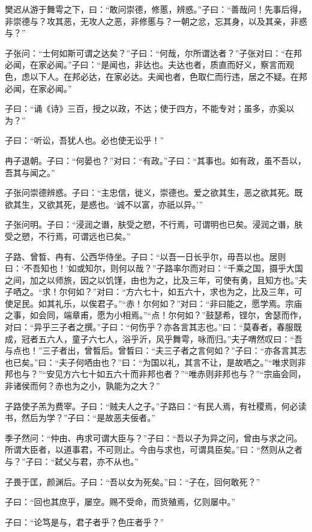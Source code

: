 \documentclass[a5paper]{ctexbook}
\begin{document}
    樊迟从游于舞雩之下，曰：“敢问崇德，修慝，辨惑。”子曰：“善哉问！先事后得，非崇德与？攻其恶，无攻人之恶，非修慝与？一朝之忿，忘其身，以及其亲，非惑与？”

    子张问：“士何如斯可谓之达矣？”子曰：“何哉，尔所谓达者？”子张对曰：“在邦必闻，在家必闻。”子曰：“是闻也，非达也。夫达也者，质直而好义，察言而观色，虑以下人。在邦必达，在家必达。夫闻也者，色取仁而行违，居之不疑。在邦必闻，在家必闻。”

    子曰：“诵《诗》三百，授之以政，不达；使于四方，不能专对；虽多，亦奚以为？”

    子曰：“听讼，吾犹人也。必也使无讼乎！”

    冉子退朝。子曰：“何晏也？”对曰：“有政。”子曰：“其事也。如有政，虽不吾以，吾其与闻之。”

    子张问崇德辨惑。子曰：“主忠信，徙义，崇德也。爱之欲其生，恶之欲其死。既欲其生，又欲其死，是惑也。‘诚不以富，亦祇以异。’”

    子张问明。子曰：“浸润之谮，肤受之愬，不行焉，可谓明也已矣。浸润之谮，肤受之愬，不行焉，可谓远也已矣。”

    子路、曾晳、冉有、公西华侍坐。子曰：“以吾一日长乎尔，毋吾以也。居则曰：‘不吾知也！’如或知尔，则何以哉？”子路率尔而对曰：“千乘之国，摄乎大国之间，加之以师旅，因之以饥馑，由也为之，比及三年，可使有勇，且知方也。”夫子哂之。“求！尔何如？”对曰：“方六七十，如五六十，求也为之，比及三年，可使足民。如其礼乐，以俟君子。”“赤！尔何如？”对曰：“非曰能之，愿学焉。宗庙之事，如会同，端章甫，愿为小相焉。”“点！尔何如？”鼓瑟希，铿尔，舍瑟而作，对曰：“异乎三子者之撰。”子曰：“何伤乎？亦各言其志也。”曰：“莫春者，春服既成，冠者五六人，童子六七人，浴乎沂，风乎舞雩，咏而归。”夫子喟然叹曰：“吾与点也！”三子者出，曾晳后。曾晳曰：“夫三子者之言何如？”子曰：“亦各言其志也已矣。”曰：“夫子何哂由也？”曰：“为国以礼，其言不让，是故哂之。”“唯求则非邦也与？”“安见方六七十如五六十而非邦也者？”“唯赤则非邦也与？”“宗庙会同，非诸侯而何？赤也为之小，孰能为之大？”

    子路使子羔为费宰。子曰：“贼夫人之子。”子路曰：“有民人焉，有社稷焉，何必读书，然后为学？”子曰：“是故恶夫佞者。”

    季子然问：“仲由、冉求可谓大臣与？”子曰：“吾以子为异之问，曾由与求之问。所谓大臣者，以道事君，不可则止。今由与求也，可谓具臣矣。”曰：“然则从之者与？”子曰：“弑父与君，亦不从也。”

    子畏于匡，颜渊后。子曰：“吾以女为死矣。”曰：“子在，回何敢死？”

    子曰：“回也其庶乎，屡空。赐不受命，而货殖焉，亿则屡中。”

    子曰：“论笃是与，君子者乎？色庄者乎？”
\end{document}
